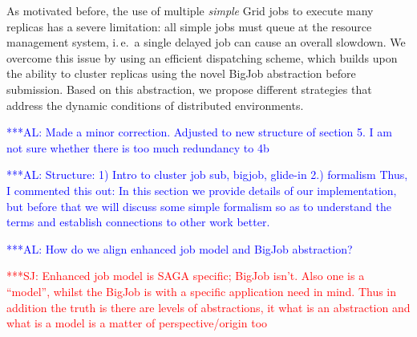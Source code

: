 \documentclass{rspublic}
\newcommand{\alnote}[1]{ {\textcolor{blue} { ***AL: #1 }}}
\newcommand{\jhanote}[1]{ {\textcolor{red} { ***SJ: #1 }}}
\newcommand{\alnote}[1]{}
\newcommand{\jhanote}[1]{}
\newcommand{\I}[1]{\textit{#1}}
\begin{document}
As motivated before, the use of multiple {\it simple} Grid jobs to
execute many replicas has a severe limitation: all simple jobs must
queue at the resource management system, i.\,e.\ a single delayed
job can cause an overall slowdown.  We overcome
this issue by using an efficient dispatching scheme, which builds upon
the ability to cluster replicas using the novel BigJob abstraction
before submission. Based on this abstraction, we propose different
strategies that address the dynamic conditions of distributed
environments.

\alnote{Made a minor correction. Adjusted to new structure of section
  5. I am not sure whether there is too much redundancy to 4b}

\alnote{Structure: 1) Intro to cluster job sub, bigjob, glide-in 2.)
  formalism Thus, I commented this out: In this section we provide
  details of our implementation, but before that we will discuss some
  simple formalism so as to understand the terms and establish
  connections to other work better.  }

\alnote{How do we align enhanced job model and BigJob abstraction?}

\jhanote{Enhanced job model is SAGA specific; BigJob isn't. Also one
  is a ``model'', whilst the BigJob is with a specific application
  need in mind. Thus in addition the truth is there are levels of
  abstractions, it what is an abstraction and what is a model is a
  matter of perspective/origin too}              

\end{document}
